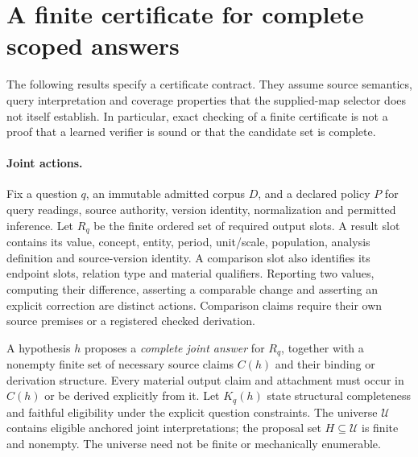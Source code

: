 
\section{A finite certificate for complete scoped answers}
\label{sec:certificate-theory}

The following results specify a certificate contract. They assume source
semantics, query interpretation and coverage properties that the supplied-map
selector does not itself establish. In particular, exact checking of a finite
certificate is not a proof that a learned verifier is sound or that the
candidate set is complete.

\paragraph{Joint actions.}
Fix a question $q$, an immutable admitted corpus $D$, and a declared policy
$P$ for query readings, source authority, version identity, normalization and
permitted inference. Let $R_q$ be the finite ordered set of required output
slots. A result slot contains its value, concept, entity, period, unit/scale,
population, analysis definition and source-version identity. A comparison slot
also identifies its endpoint slots, relation type and material qualifiers.
Reporting two values, computing their difference, asserting a comparable
change and asserting an explicit correction are distinct actions. Comparison
claims require their own source premises or a registered checked derivation.

A hypothesis $h$ proposes a \emph{complete joint answer} for $R_q$, together
with a nonempty finite set of necessary source claims $C(h)$ and their binding
or derivation structure. Every material output claim and attachment must occur
in $C(h)$ or be derived explicitly from it. Let $K_q(h)$ state structural
completeness and faithful eligibility under the explicit question constraints.
The universe $\mathcal U$ contains eligible anchored joint interpretations;
the proposal set $H\subseteq\mathcal U$ is finite and nonempty. The universe
need not be finite or mechanically enumerable.

